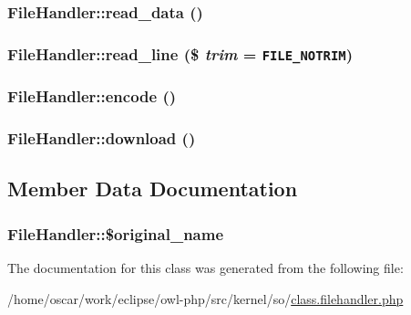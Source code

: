 \hypertarget{classFileHandler_1389a6ea19a22471c301d70b5ed68ed8}{
\subsubsection{\setlength{\rightskip}{0pt plus 5cm}FileHandler::read\_\-data ()}}
\label{classFileHandler_1389a6ea19a22471c301d70b5ed68ed8}


\hypertarget{classFileHandler_69f84a8138f717c84f560125f1f95448}{
\subsubsection{\setlength{\rightskip}{0pt plus 5cm}FileHandler::read\_\-line (\$ {\em trim} = {\tt {\bf FILE\_\-NOTRIM}})}}
\label{classFileHandler_69f84a8138f717c84f560125f1f95448}


\hypertarget{classFileHandler_a29360bf94fd54d906256561f33d93ad}{
\subsubsection{\setlength{\rightskip}{0pt plus 5cm}FileHandler::encode ()}}
\label{classFileHandler_a29360bf94fd54d906256561f33d93ad}


\hypertarget{classFileHandler_c17edc9b92643c32ae6040b1235c64dd}{
\subsubsection{\setlength{\rightskip}{0pt plus 5cm}FileHandler::download ()}}
\label{classFileHandler_c17edc9b92643c32ae6040b1235c64dd}




\subsection{Member Data Documentation}
\hypertarget{classFileHandler_477708585850c3c8725ccf56bfe0b4a8}{
\subsubsection{\setlength{\rightskip}{0pt plus 5cm}FileHandler::\$original\_\-name}}
\label{classFileHandler_477708585850c3c8725ccf56bfe0b4a8}




The documentation for this class was generated from the following file:\begin{CompactItemize}
\item 
/home/oscar/work/eclipse/owl-php/src/kernel/so/\hyperlink{class_8filehandler_8php}{class.filehandler.php}\end{CompactItemize}
